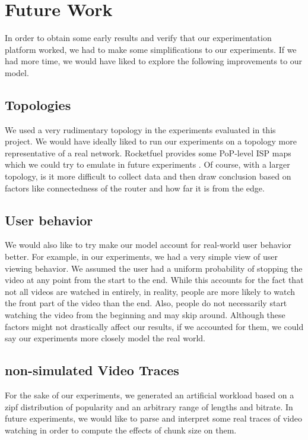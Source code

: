 \section{Future Work} \label{sec:futurework}

In order to obtain some early results and verify that our experimentation
platform worked, we had to make some simplifications to our experiments. If we
had more time, we would have liked to explore the following improvements to our
model.

\subsection{Topologies} \label{sec:topologies}

We used a very rudimentary topology in the experiments evaluated in this
project. We would have ideally liked to run our experiments on a topology more
representative of a real network. Rocketfuel provides some PoP-level ISP maps
which we could try to emulate in future experiments \cite{3}. Of course, with a larger
topology, is it more difficult to collect data and then draw conclusion based on
factors like connectedness of the router and how far it is from the edge.

\subsection{User behavior} \label{sec:userbehavior}

We would also like to try make our model account for real-world user behavior
better. For example, in our experiments, we had a very simple view of user
viewing behavior. We assumed the user had a uniform probability of stopping the
video at any point from the start to the end. While this accounts for the fact
that not all videos are watched in entirely, in reality, people are more likely
to watch the front part of the video than the end. Also, people do not
necessarily start watching the video from the beginning and may skip around.
Although these factors might not drastically affect our results, if we accounted
for them, we could say our experiments more closely model the real world.

\subsection{non-simulated Video Traces} \label{sec:traces}

For the sake of our experiments, we generated an artificial workload based on a
zipf distribution of popularity and an arbitrary range of lengths and bitrate.
In future experiments, we would like to parse and interpret some real traces of
video watching in order to compute the effects of chunk size on them. 

